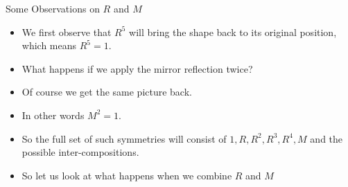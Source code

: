 \documentclass[ %
 10pt, xcolor={dvipsnames,svgnames,x11names,hyperref},
   hyperref={colorlinks=true,citecolor=green,linkcolor=DarkRed,urlcolor=ProcessBlue,anchorcolor=blue}
  ]{beamer}
\newenvironment{stepitemize}{\begin{itemize}[<+->]}{\end{itemize} }
\begin{document}
\begin{frame}{Some Observations on $R$ and $M$}
\begin{stepitemize}
\item We first observe that $R^5$ will bring the shape back to its original position, which means $R^5=1$.
\item What happens if we apply the mirror reflection twice?
\item Of course we get the same picture back.
\item In other words $M^2=1$.
\item So the full set of such symmetries will consist of
$1, R, R^2, R^3, R^4, M$ and the possible inter-compositions.
\item So let us look at what happens when we combine $R$ and $M$
\end{stepitemize}
\end{frame}
\end{document}
